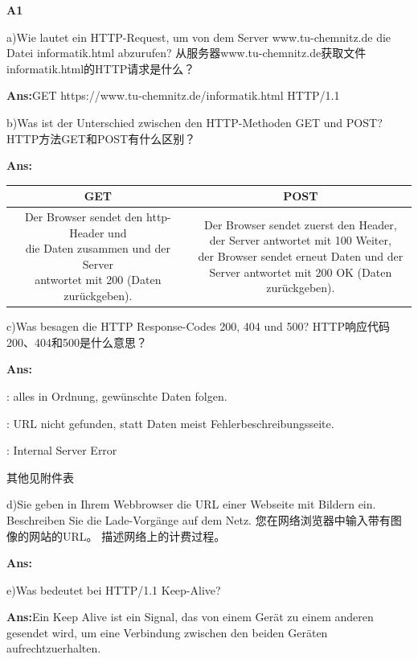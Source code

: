 \documentclass[fleqn]{article}
\begin{document}
\noindent\textbf{A1}

a)Wie lautet ein HTTP-Request, um von dem Server  www.tu-chemnitz.de  die  Datei informatik.html abzurufen? 
从服务器www.tu-chemnitz.de获取文件informatik.html的HTTP请求是什么？

\textbf{Ans:}GET https://www.tu-chemnitz.de/informatik.html HTTP/1.1

b)Was ist der Unterschied zwischen den HTTP-Methoden GET und POST? HTTP方法GET和POST有什么区别？

\textbf{Ans:}
\begin{center}
    \begin{tabular}{c|c}
        GET&POST\\
        \hline
        \shortstack[l]{Der Browser sendet den http-Header und \\
        die Daten zusammen und der Server\\
         antwortet mit 200 (Daten zurückgeben).}&\shortstack{Der Browser sendet zuerst den Header, \\
         der Server antwortet mit 100 Weiter, \\
         der Browser sendet erneut Daten und der \\
         Server antwortet mit 200 OK (Daten zurückgeben).}
        
    \end{tabular}
\end{center}


c)Was besagen die HTTP Response-Codes 200, 404 und 500? HTTP响应代码200、404和500是什么意思？

\textbf{Ans:}

\indent{}: alles in Ordnung, gewünschte Daten folgen.

\indent{}: URL nicht gefunden, statt Daten meist Fehlerbeschreibungsseite.

\indent{}: Internal Server Error

其他见附件表

d)Sie geben in Ihrem Webbrowser die URL einer Webseite mit Bildern ein. Beschreiben Sie die Lade-Vorgänge auf dem Netz. 
您在网络浏览器中输入带有图像的网站的URL。 描述网络上的计费过程。

\textbf{Ans:}

e)Was bedeutet bei HTTP/1.1 Keep-Alive? 

\textbf{Ans:}Ein Keep Alive ist ein Signal, das von einem Gerät zu einem anderen gesendet wird, um eine Verbindung zwischen den beiden Geräten aufrechtzuerhalten. 
\end{document}
